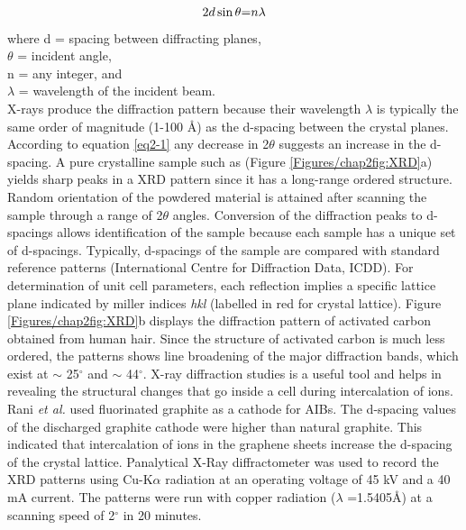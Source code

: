  \begin{equation} \label{eq2-1}
     2d\sin\theta \text= n{\lambda}
 \end{equation}
 where d = spacing between diffracting planes,\\
$\theta$ = incident angle,\\ 
n = any integer, and \\
$\lambda$ = wavelength of the incident beam.\\
X-rays produce the diffraction pattern because their wavelength $\lambda$ is typically the same order of magnitude (1-100 \AA) as the d-spacing between the crystal planes. According to equation \ref{eq2-1} any decrease in 2$\theta$ suggests an increase in the d-spacing. A pure crystalline sample such as  (Figure \ref{Figures/chap2fig:XRD}a) yields sharp peaks in a XRD pattern since it has a long-range ordered structure. Random orientation of the powdered material is attained after scanning the sample through a range of 2$\theta$ angles. Conversion of the diffraction peaks to d-spacings allows identification of the sample because each sample has a unique set of d-spacings. Typically, d-spacings of the sample are compared with standard reference patterns (International Centre for Diffraction Data, ICDD). For determination of unit cell parameters, each reflection implies a specific lattice plane indicated by miller indices \textit{hkl} (labelled in red  for  crystal lattice). Figure \ref{Figures/chap2fig:XRD}b displays the diffraction pattern of activated carbon obtained from human hair. Since the structure of activated carbon is much less ordered, the patterns shows line broadening of the major diffraction bands, which exist at $\sim$ 25$^{\circ}$  and $\sim$ 44$^{\circ}$.
X-ray diffraction studies is a useful tool and helps in revealing the structural changes that go inside a cell during intercalation of ions. Rani \textit{et al.} used fluorinated graphite as a cathode for AIBs. The d-spacing values of the discharged graphite cathode were higher than natural graphite. This indicated that intercalation of  ions in the graphene sheets increase the d-spacing of the crystal lattice\cite{rani_fluorinated_2013}.
Panalytical X-Ray diffractometer was used to record the XRD patterns using Cu-K$\alpha$ radiation at an operating voltage of 45 kV and a 40 mA current. The patterns were run with copper radiation ($\lambda$ =1.5405\AA) at a scanning speed of 2$^{\circ}$ in 20 minutes. 


